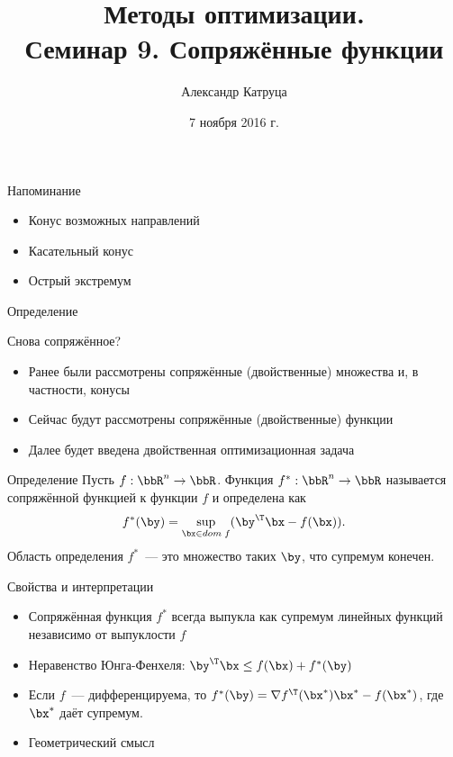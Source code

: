 \documentclass[12pt,russian]{beamer}
\title[Семинар 9]{Методы оптимизации. \\
 Семинар 9. Сопряжённые функции}
\author{Александр Катруца}
\institute{Московский физико-технический институт,\\
Факультет Управления и Прикладной Математики}
\date{7 ноября 2016 г.}
\begin{document}
\begin{frame}
\maketitle
\end{frame}

\begin{frame}{Напоминание}
\begin{itemize}
\item Конус возможных направлений
\item Касательный конус
\item Острый экстремум
\end{itemize}
\end{frame}

\begin{frame}{Определение}
\begin{block}{Снова сопряжённое?}
\begin{itemize}
\item Ранее были рассмотрены сопряжённые (двойственные) множества и, в частности, конусы
\item Сейчас будут рассмотрены сопряжённые (двойственные) функции
\item Далее будет введена двойственная оптимизационная задача 
\end{itemize}
\end{block}

\begin{block}{Определение}
Пусть $f: \bbR^n \rightarrow \bbR$. 
Функция $f^*: \bbR^n \rightarrow \bbR$ называется сопряжённой функцией к функции $f$ и определена как
\vspace{-4mm}
\[
f^*(\by) = \sup\limits_{\bx \in dom \; f} (\by^{\T}\bx - f(\bx)).
\vspace{-3mm}
\]
Область определения $f^*$~--- это множество таких $\by$, что супремум конечен. 

\end{block}
\end{frame}

\begin{frame}{Свойства и интерпретации}
\begin{itemize}
\item Сопряжённая функция $f^*$ всегда выпукла как супремум линейных функций независимо от выпуклости $f$
\item Неравенство Юнга-Фенхеля: $\by^{\T}\bx \leq f(\bx) + f^*(\by)$
\item Если $f$~--- дифференцируема, то $f^*(\by) = \nabla f^{\T}(\bx^*)\bx^* - f(\bx^*)$, где $\bx^*$ даёт супремум.
\item Геометрический смысл
\end{itemize}
\end{frame}
\end{document}
